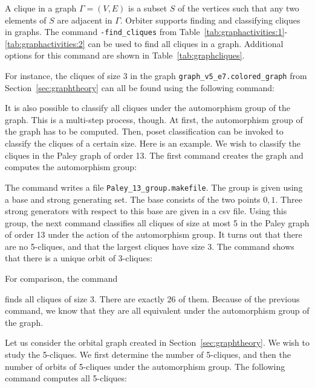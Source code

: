 A clique in a graph $\Gamma = (V,E)$ is a subset $S$ of the vertices 
such that any two elements of $S$ are adjacent in $\Gamma.$
Orbiter supports finding and classifying cliques in graphs.
The command \verb'-find_cliques' from 
Table~\ref{tab:graphactivities:1}-\ref{tab:graphactivities:2} 
can be used to find all cliques in a graph.
Additional options for this command are shown in 
Table~\ref{tab:graphcliques}.

For instance, the cliques of size 3 in the graph 
\verb'graph_v5_e7.colored_graph' 
from Section~\ref{sec:graphtheory} 
can all be found using the following command:



\bigskip

It is also possible to classify all cliques 
under the automorphism group of the graph. 
This is a multi-step process, though. 
At first, the automorphism group of the graph has to be computed. 
Then, poset classification can be invoked 
to classify the cliques of a certain size. 
Here is an example.
We wish to classify the cliques in the Paley graph of order 13. 
The first command creates the graph and computes the automorphism group:


The command writes a file \verb'Paley_13_group.makefile'.
The group is given using a base and strong generating set. 
The base 
consists of the two points $0,1.$ 
Three strong generators with respect to this base are given in a csv file.
Using this group, 
the next command classifies all cliques 
of size at most 5 in the Paley graph of order 13 
under the action of the automorphism group. 
It turns out that there are no 5-cliques, 
and that the largest cliques have size 3. 
The command shows that there is a unique orbit of 3-cliques:


For comparison, the command 


finds all cliques of size 3. There are exactly 26 of them. 
Because of the previous command, 
we know that they are all equivalent under 
the automorphism group of the graph.


\bigskip

Let us consider the orbital graph created in Section~\ref{sec:graphtheory}.
We wish to study the 5-cliques. 
We first determine the number of 5-cliques, 
and then the number of orbits of 5-cliques under the automorphism group. 
The following command computes all 5-cliques:

